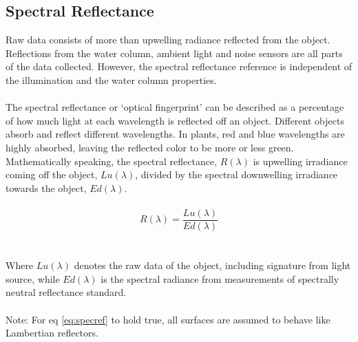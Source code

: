 \subsection{Spectral Reflectance}
Raw data consists of more than upwelling radiance reflected from the object. Reflections from the water column, ambient light and noise sensors are all parts of the data collected. However, the spectral reflectance reference is independent of the illumination and the water column properties. 
\\\\
The spectral reflectance or ‘optical fingerprint’ can be described as a percentage of how much light at each wavelength is reflected off an object. Different objects absorb and reflect different wavelengths. In plants, red and blue wavelengths are highly absorbed, leaving the reflected color to be more or less green. Mathematically speaking, the spectral reflectance, $R(\lambda)$ is upwelling irradiance coming off the object, $Lu(\lambda)$, divided by the spectral downwelling irradiance towards the object, $Ed(\lambda)$.
\\\\
\begin{equation} \label{eq:specref}
    R(\lambda) = \frac{Lu(\lambda)}{Ed(\lambda)}
\end{equation}
\\\\
Where $Lu(\lambda)$ denotes the raw data of the object, including signature from light source, while $Ed(\lambda)$ is the spectral radiance from measurements of spectrally neutral reflectance standard.
\\\\
Note: For eq \ref{eq:specref} to hold true, all surfaces are assumed to behave like Lambertian reflectors. 

\vspace{1.3cm}
